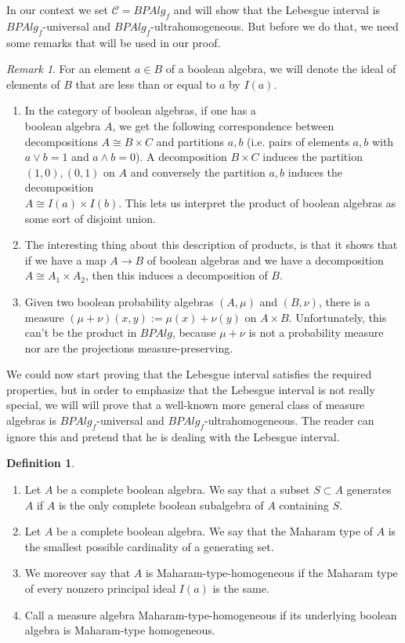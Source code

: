 \documentclass[a4paper]{amsproc}
\theoremstyle{plain}
\theoremstyle{definition}
\newtheorem{definition}[theorem]{Definition}
\theoremstyle{remark}
\newtheorem{remark}[theorem]{Remark}
\numberwithin{equation}{section}
\begin{document}
In our context we set $\mathcal{C}=BPAlg_f$ and will show that the Lebesgue interval is $BPAlg_f$-universal and $BPAlg_f$-ultrahomogeneous. But before we do that, we need some remarks that will be used in our proof.

\begin{remark}\label{partitions}
For an element $a \in B$ of a boolean algebra, we will denote the ideal of elements of $B$ that are less than or equal to $a$ by $I(a)$.
\begin{enumerate}
\item In the category of boolean algebras, if one has a \\ boolean algebra $A$, we get the following correspondence between decompositions $A \cong B \times C$ and partitions $a,b$ (i.e. pairs of elements $a,b$ with $a \vee b = 1$ and $a \wedge b = 0$). A decomposition $B \times C$ induces the partition $(1,0), (0,1)$ on $A$ and conversely the partition $a,b$ induces the decomposition \\ $A \cong I(a) \times I(b)$. This lets us interpret the product of boolean algebras as some sort of disjoint union.
\item The interesting thing about this description of products, is that it shows that if we have a map $A \to B$ of boolean algebras and we have a decomposition $A \cong A_1 \times A_2$, then this induces a decomposition of $B$.
\item Given two boolean probability algebras $(A, \mu)$ and $(B, \nu)$, there is a measure $(\mu + \nu)(x,y) := \mu(x) + \nu(y)$ on $A \times B$. Unfortunately, this can't be the product in $BPAlg$, because $\mu + \nu$ is not a probability measure nor are the projections measure-preserving.
\end{enumerate}
\end{remark}

We could now start proving that the Lebesgue interval satisfies the required properties, but in order to emphasize that the Lebesgue interval is not really special, we will will prove that a well-known more general class of measure algebras is $BPAlg_f$-universal and $BPAlg_f$-ultrahomogeneous. The reader can ignore this and pretend that he is dealing with the Lebesgue interval.

\begin{definition} \label{maharam_type_homogeneous}
\begin{enumerate}
\item Let $A$ be a complete boolean algebra. We say that a subset $S \subset A$ generates $A$ if $A$ is the only complete boolean subalgebra of $A$ containing $S$.
\item Let $A$ be a complete boolean algebra. We say that the Maharam type of $A$ is the smallest possible cardinality of a generating set.
\item We moreover say that $A$ is Maharam-type-homogeneous if the Maharam type of every nonzero principal ideal $I(a)$ is the same.
\item Call a measure algebra Maharam-type-homogeneous if its underlying boolean algebra is Maharam-type homogeneous.
\end{enumerate}
\end{definition}
\end{document}
